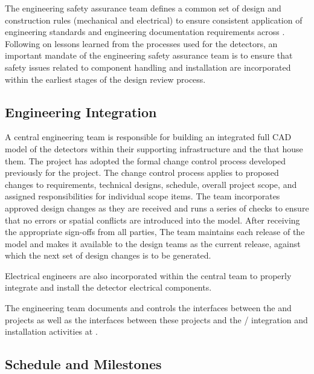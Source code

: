 The  engineering safety assurance team defines a common 
set of design and construction rules (mechanical and electrical) to 
ensure consistent application of engineering standards and engineering 
documentation requirements across . 
Following on lessons learned from the processes used for the 
 detectors, an important mandate of the engineering 
safety assurance team is to ensure that safety issues related to 
component handling and installation are incorporated within the 
earliest stages of the design review process.


\subsection{Engineering Integration}
\label{sec:dune_engineering}


A central  engineering team  is responsible for building  
an integrated full \threed CAD model of the detectors within their supporting
infrastructure and the  that house them.  
The  project has adopted 
the formal change control process developed previously for the 
 project.  The change control process applies to 
proposed changes to requirements, technical designs, 
schedule, overall project scope, and assigned responsibilities 
for individual scope items. 
The  team incorporates approved design changes as they 
are received and runs a series of checks to ensure that no errors 
or spatial conflicts are introduced into the model. After receiving the 
appropriate sign-offs from all parties, 
The  team maintains  
each release  of the model and makes it available to the 
design teams as the current release, against which the next set 
of design changes is to be generated. 

Electrical engineers are also incorporated within the central
 team to properly integrate and install 
the detector electrical components.  

The  engineering team documents and
controls the interfaces between the  and  
projects as well as the interfaces between these projects and the 
/ integration and installation activities 
at .  


\subsection{Schedule and Milestones}
\label{sec:dune_schedule}

